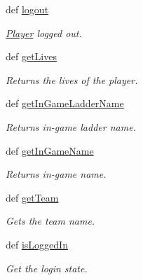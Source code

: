 \begin{DoxyCompactItemize}
def \hyperlink{class_player_1_1_player_a1f91a0f380efed515111952b96f6a90e}{logout}
\begin{DoxyCompactList}\small\item\em \hyperlink{class_player_1_1_player}{Player} logged out. \item\end{DoxyCompactList}\item 
def \hyperlink{class_player_1_1_player_a293131894621a14d2f6741e2be29451d}{getLives}
\begin{DoxyCompactList}\small\item\em Returns the lives of the player. \item\end{DoxyCompactList}\item 
def \hyperlink{class_player_1_1_player_ab810708370e380e49f9e4885f42df037}{getInGameLadderName}
\begin{DoxyCompactList}\small\item\em Returns in-\/game ladder name. \item\end{DoxyCompactList}\item 
def \hyperlink{class_player_1_1_player_a80f2beaf026556ed4b4e432ebec249d4}{getInGameName}
\begin{DoxyCompactList}\small\item\em Returns in-\/game name. \item\end{DoxyCompactList}\item 
def \hyperlink{class_player_1_1_player_abc21f488a31729c70d7fd3dea220c599}{getTeam}
\begin{DoxyCompactList}\small\item\em Gets the team name. \item\end{DoxyCompactList}\item 
def \hyperlink{class_player_1_1_player_ab885654a8f7f9992029930623bbce7cf}{isLoggedIn}
\begin{DoxyCompactList}\small\item\em Get the login state. \item\end{DoxyCompactList}\end{DoxyCompactItemize}
